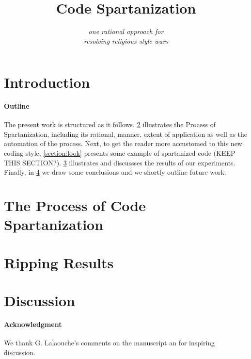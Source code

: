 \documentclass[preprint,10pt,nonatbib]{sigplanconf}
\title{Code Spartanization}
\subtitle{\scriptsize \emph{one rational approach for\\ resolving religious style wars}}
\begin{document}
\maketitle

\def\ignore#1{}
\def\gal{\marginpar[G$\Rightarrow$]{$\Leftarrow$G}}
\def\yossi{\marginpar[Y$\Rightarrow$]{$\Leftarrow$Y}}
\def\matteo{\marginpar[M$\Rightarrow$]{$\Leftarrow$M}}

\begin{abstract}
  
\end{abstract}

\section{Introduction}


\paragraph{Outline}
The present work is structured as it follows.
\cref{section:principia} illustrates the Process of Spartanization, 
including its rational, manner, extent of application as well as
the automation of the process. 
Next, to get the reader more accustomed to this new coding style, 
\cref{section:look} presents some example of spartanized code (KEEP THIS SECTION?).
\cref{section:initial} illustrates and discussses 
the results of our experiments.
Finally, in \cref{section:zz} we draw some conclusions and we shortly
outline future work.

\section{The Process of Code Spartanization}
\label{section:principia}


\section{Ripping Results}
\label{section:initial}


\section{Discussion}
\label{section:zz}


\paragraph{Acknowledgment}
We thank G. Lalaouche's comments on the manuscript an for 
inspiring discussion.
\end{document}
